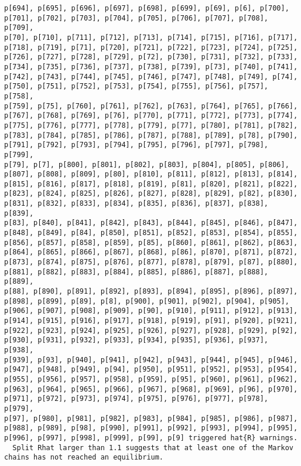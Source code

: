 \documentclass[
  letterpaper,
  DIV=11,
  numbers=noendperiod]{scrartcl}
\begin{document}
\begin{verbatim}
p[694], p[695], p[696], p[697], p[698], p[699], p[69], p[6], p[700],
p[701], p[702], p[703], p[704], p[705], p[706], p[707], p[708], p[709],
p[70], p[710], p[711], p[712], p[713], p[714], p[715], p[716], p[717],
p[718], p[719], p[71], p[720], p[721], p[722], p[723], p[724], p[725],
p[726], p[727], p[728], p[729], p[72], p[730], p[731], p[732], p[733],
p[734], p[735], p[736], p[737], p[738], p[739], p[73], p[740], p[741],
p[742], p[743], p[744], p[745], p[746], p[747], p[748], p[749], p[74],
p[750], p[751], p[752], p[753], p[754], p[755], p[756], p[757], p[758],
p[759], p[75], p[760], p[761], p[762], p[763], p[764], p[765], p[766],
p[767], p[768], p[769], p[76], p[770], p[771], p[772], p[773], p[774],
p[775], p[776], p[777], p[778], p[779], p[77], p[780], p[781], p[782],
p[783], p[784], p[785], p[786], p[787], p[788], p[789], p[78], p[790],
p[791], p[792], p[793], p[794], p[795], p[796], p[797], p[798], p[799],
p[79], p[7], p[800], p[801], p[802], p[803], p[804], p[805], p[806],
p[807], p[808], p[809], p[80], p[810], p[811], p[812], p[813], p[814],
p[815], p[816], p[817], p[818], p[819], p[81], p[820], p[821], p[822],
p[823], p[824], p[825], p[826], p[827], p[828], p[829], p[82], p[830],
p[831], p[832], p[833], p[834], p[835], p[836], p[837], p[838], p[839],
p[83], p[840], p[841], p[842], p[843], p[844], p[845], p[846], p[847],
p[848], p[849], p[84], p[850], p[851], p[852], p[853], p[854], p[855],
p[856], p[857], p[858], p[859], p[85], p[860], p[861], p[862], p[863],
p[864], p[865], p[866], p[867], p[868], p[86], p[870], p[871], p[872],
p[873], p[874], p[875], p[876], p[877], p[878], p[879], p[87], p[880],
p[881], p[882], p[883], p[884], p[885], p[886], p[887], p[888], p[889],
p[88], p[890], p[891], p[892], p[893], p[894], p[895], p[896], p[897],
p[898], p[899], p[89], p[8], p[900], p[901], p[902], p[904], p[905],
p[906], p[907], p[908], p[909], p[90], p[910], p[911], p[912], p[913],
p[914], p[915], p[916], p[917], p[918], p[919], p[91], p[920], p[921],
p[922], p[923], p[924], p[925], p[926], p[927], p[928], p[929], p[92],
p[930], p[931], p[932], p[933], p[934], p[935], p[936], p[937], p[938],
p[939], p[93], p[940], p[941], p[942], p[943], p[944], p[945], p[946],
p[947], p[948], p[949], p[94], p[950], p[951], p[952], p[953], p[954],
p[955], p[956], p[957], p[958], p[959], p[95], p[960], p[961], p[962],
p[963], p[964], p[965], p[966], p[967], p[968], p[969], p[96], p[970],
p[971], p[972], p[973], p[974], p[975], p[976], p[977], p[978], p[979],
p[97], p[980], p[981], p[982], p[983], p[984], p[985], p[986], p[987],
p[988], p[989], p[98], p[990], p[991], p[992], p[993], p[994], p[995],
p[996], p[997], p[998], p[999], p[99], p[9] triggered hat{R} warnings.
  Split Rhat larger than 1.1 suggests that at least one of the Markov
chains has not reached an equilibrium.
 

\end{verbatim}
\end{document}
